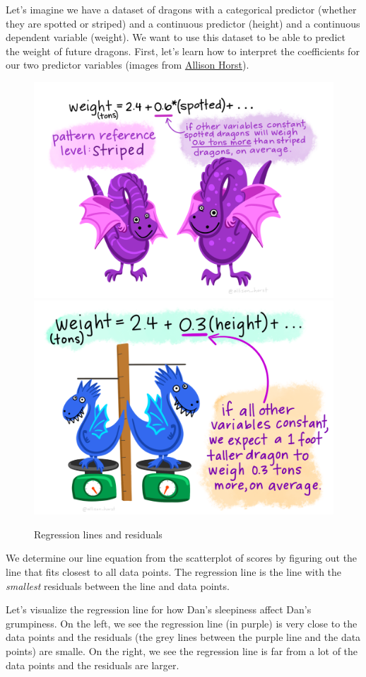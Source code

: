 \documentclass[
]{book}
\begin{document}
Let's imagine we have a dataset of dragons with a categorical predictor (whether they are spotted or striped) and a continuous predictor (height) and a continuous dependent variable (weight). We want to use this dataset to be able to predict the weight of future dragons. First, let's learn how to interpret the coefficients for our two predictor variables (images from \href{https://github.com/allisonhorst/stats-illustrations\#multiple-linear-regression-dragons-thread}{Allison Horst}).

\begin{figure}

{\centering \includegraphics[width=0.49\linewidth]{images/13-regression/dragon_categorical} \includegraphics[width=0.49\linewidth]{images/13-regression/dragons_continuous} 

}

\caption{Regression lines and residuals}\label{fig:unnamed-chunk-2}
\end{figure}

We determine our line equation from the scatterplot of scores by figuring out the line that fits closest to all data points. The regression line is the line with the \emph{smallest} residuals between the line and data points.

Let's visualize the regression line for how Dan's sleepiness affect Dan's grumpiness. On the left, we see the regression line (in purple) is very close to the data points and the residuals (the grey lines between the purple line and the data points) are smalle. On the right, we see the regression line is far from a lot of the data points and the residuals are larger.
\end{document}
